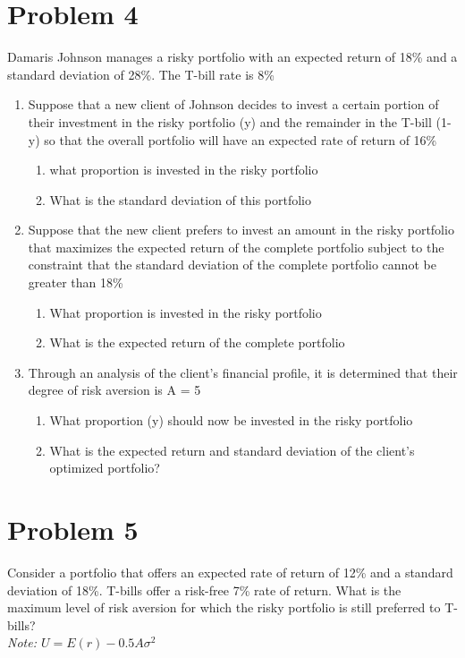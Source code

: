 \documentclass[12]{article}
\begin{document}
\section*{Problem 4}
Damaris Johnson manages a risky portfolio with an expected return of 18\% and a standard deviation of 28\%. The T-bill rate is 8\%
\begin{enumerate}
    \item[a)]  Suppose that a new client of Johnson decides to invest a certain portion of their investment in the risky portfolio (y) and the remainder in the T-bill (1-y)  so that the overall portfolio will have an expected rate of return of 16\%
    \begin{enumerate}
        \item[i.] what proportion is invested in the risky portfolio
        \item[ii.] What is the standard deviation of this portfolio
    \end{enumerate}
    \item[b)] Suppose that the new client prefers to invest an amount in the risky portfolio that maximizes the expected return of the complete portfolio subject to the constraint that the standard deviation of the complete portfolio cannot be greater than 18\%
    \begin{enumerate}
        \item[i.] What proportion is invested in the risky portfolio
        \item[ii.] What is the expected return of the complete portfolio
    \end{enumerate}
    \item[c)] Through an analysis of the client's financial profile, it is determined that their degree of risk aversion is A = 5
    \begin{enumerate}
        \item[i.] What proportion (y) should now be invested in the risky portfolio
        \item[ii.] What is the expected return and standard deviation of the client's optimized portfolio?
    \end{enumerate}
\end{enumerate}


\section*{Problem 5}
Consider a portfolio that offers an expected rate of return of 12\% and a standard deviation of 18\%. T-bills offer a risk-free 7\% rate of return. What is the maximum level of risk aversion for which the risky portfolio is still preferred to T-bills?\\
\textit{Note: $U = E(r) - 0.5A\sigma^2$}
\end{document}
